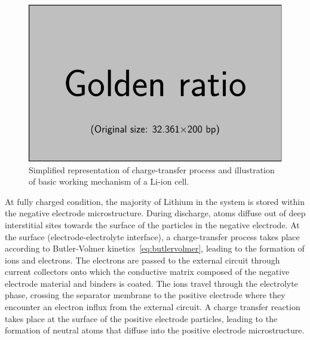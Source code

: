 \begin{figure}[!htbp]
    \centering
    \includegraphics{placeholder_images/example-image-golden.pdf}
    \caption[Charge-transer and basic working mechanism of a Li-ion cell]{Simplified representation of charge-transfer
    process and illustration of basic working mechanism of a Li-ion cell.}
    \label{fig:chargetransferprocess}
\end{figure}

At fully  charged condition,  the majority  of Lithium in  the system  is stored
within  the  negative  electrode  microstructure.  During  discharge,  
atoms  diffuse  out of  deep  interstitial  sites  towards  the surface  of  the
particles  in  the negative  electrode.  At  the surface  (electrode-electrolyte
interface),  a charge-transfer  process takes  place according  to Butler-Volmer
kinetics~\cref{eq:butlervolmer}, leading to the  formation of  ions and
electrons.  The electrons  are passed  to the  external circuit  through 
current collectors  onto which  the conductive matrix  composed of  the negative
electrode material and binders is coated.  The  ions travel through the
electrolyte phase,  crossing the  separator membrane  to the  positive electrode
where they  encounter an  electron influx  from the  external circuit.  A charge
transfer  reaction  takes  place  at  the  surface  of  the  positive  electrode
particles, leading to the formation of neutral  atoms that diffuse into
the positive electrode microstructure.


